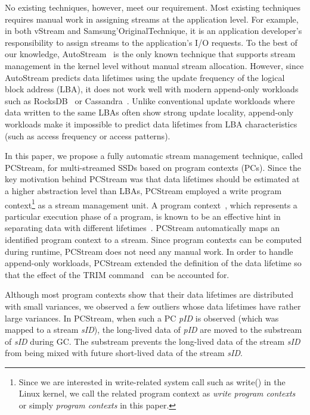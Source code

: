 No existing techniques, however, meet our requirement.  
Most existing techniques~\cite{MultiStream, Level, FStream, vStream} requires manual work 
in assigning streams at the application level.  For example,  in both \textsf{\small vStream} and
\textsf{\small Samsung'OriginalTechnique}, it is an application developer's responsibility to assign streams 
to the application's I/O requests.  To the best of our knowledge, 
\textsf{\small AutoStream}~\cite{AutoStream} is the only known technique
that supports stream management in the kernel level without manual stream allocation.
However, since \textsf{\small AutoStream} predicts data lifetimes using the update frequency 
of the logical block address (LBA), it does not work well with modern append-only workloads 
such as RocksDB~\cite{RocksDB} or Cassandra~\cite{Cassandra}.  
Unlike conventional update workloads where data written to the same LBAs 
often show strong update locality, 
append-only workloads make it impossible to predict data lifetimes 
from LBA characteristics (such as access frequency or access patterns).  

In this paper, we propose a fully automatic stream management technique, called \textsf{\small PCStream}, 
for multi-streamed SSDs based on program contexts (PCs).
Since the key motivation behind \textsf{\small PCStream} was 
that data lifetimes should be estimated at a higher abstraction level than LBAs, 
\textsf{\small PCStream} employed a write program context\footnote{Since we are interested in write-related 
system call such as write() in the Linux kernel, 
we call the related program context as 
{\it write program contexts} or simply {\it program contexts} in this paper.}  
as a stream management unit.
A program context~\cite{PC, PC2}, which represents a particular execution phase of a program, 
is known to be an effective hint in separating data with different lifetimes~\cite{PCHa}.  
\textsf{\small PCStream} automatically maps an identified program context to a stream.  
Since program contexts can be computed during runtime, 
\textsf{\small PCStream} does not need any manual work.   
In order to handle append-only workloads, 
\textsf{\small PCStream} extended the definition of the data lifetime 
so that the effect of the TRIM command~\cite{TRIM} can be accounted for. 

Although most program contexts show that their data lifetimes are 
distributed with small variances, we observed a few outliers 
whose data lifetimes have rather large variances.
In \textsf{\small PCStream}, 
when such a PC {\it pID} is observed (which was mapped to a stream {\it sID}), 
the long-lived data of {\it pID} are moved to the substream of {\it sID}
during GC.  
The substream prevents the long-lived data of the stream {\it sID} 
from being mixed with future short-lived data of the stream {\it sID}.

